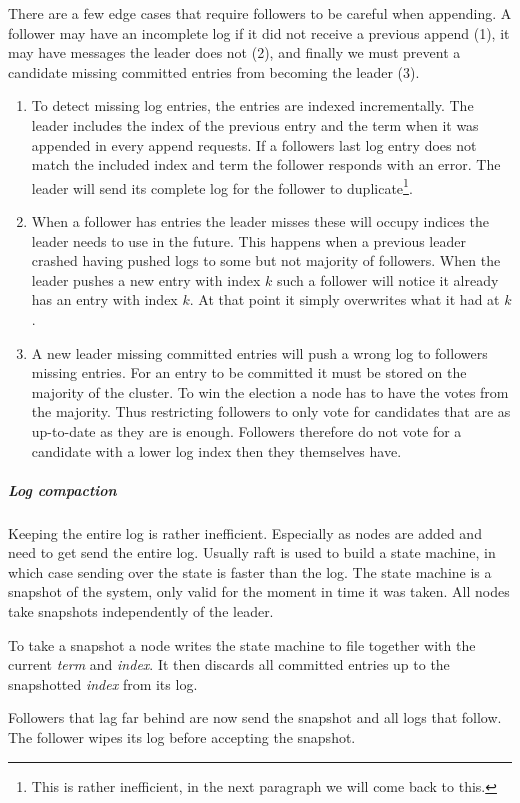 There are a few edge cases that require followers to be careful when appending. A follower may have an incomplete log if it did not receive a previous append (1), it may have messages the leader does not (2), and finally we must prevent a candidate missing committed entries from becoming the leader (3).
%
\begin{enumerate}
	\item To detect missing log entries, the entries are indexed incrementally. The leader includes the index of the previous entry and the term when it was appended in every append requests. If a followers last log entry does not match the included index and term the follower responds with an error. The leader will send its complete log for the follower to duplicate\footnote{This is rather inefficient, in the next paragraph we will come back to this.}.
	\item When a follower has entries the leader misses these will occupy indices the leader needs to use in the future. This happens when a previous leader crashed having pushed logs to some but not majority of followers. When the leader pushes a new entry with index $k$ such a follower will notice it already has an entry with index $k$. At that point it simply overwrites what it had at $k$.
	\item A new leader missing committed entries will push a wrong log to followers missing entries. For an entry to be committed it must be stored on the majority of the cluster. To win the election a node has to have the votes from the majority. Thus restricting followers to only vote for candidates that are as up-to-date as they are is enough. Followers therefore do not vote for a candidate with a lower log index then they themselves have.
\end{enumerate}

\subparagraph{Log compaction} \label{par:logcomp}
Keeping the entire log is rather inefficient. Especially as nodes are added and need to get send the entire log. Usually raft is used to build a state machine, in which case sending over the state is faster than the log. The state machine is a snapshot of the system, only valid for the moment in time it was taken. All nodes take snapshots independently of the leader. 

To take a snapshot a node writes the state machine to file together with the current \textit{term} and \textit{index}. It then discards all committed entries up to the snapshotted \textit{index} from its log. 

Followers that lag far behind are now send the snapshot and all logs that follow. The follower wipes its log before accepting the snapshot.

